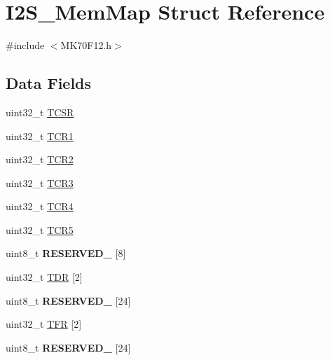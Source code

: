 \hypertarget{struct_i2_s___mem_map}{}\section{I2\+S\+\_\+\+Mem\+Map Struct Reference}
\label{struct_i2_s___mem_map}


{\ttfamily \#include $<$M\+K70\+F12.\+h$>$}

\subsection*{Data Fields}
\begin{DoxyCompactItemize}
\item 
uint32\+\_\+t \hyperlink{struct_i2_s___mem_map_a6a6cb435306769616551657a370e1aec}{T\+C\+S\+R}
\item 
uint32\+\_\+t \hyperlink{struct_i2_s___mem_map_a1e90b98887869de05cc981b80e2f50b4}{T\+C\+R1}
\item 
uint32\+\_\+t \hyperlink{struct_i2_s___mem_map_aa3e215825b6d333e5ee6ef35541b0474}{T\+C\+R2}
\item 
uint32\+\_\+t \hyperlink{struct_i2_s___mem_map_a98ceb21993839e209a3634870391b6a7}{T\+C\+R3}
\item 
uint32\+\_\+t \hyperlink{struct_i2_s___mem_map_a933a94f14922497e04bd3178585e6288}{T\+C\+R4}
\item 
uint32\+\_\+t \hyperlink{struct_i2_s___mem_map_ac559d60e95112859062a4a5427ebbc61}{T\+C\+R5}
\item 
\hypertarget{struct_i2_s___mem_map_aad317e69764cd5352bf752ca2d522c23}{}uint8\+\_\+t {\bfseries R\+E\+S\+E\+R\+V\+E\+D\+\_} \mbox{[}8\mbox{]}\label{struct_i2_s___mem_map_aad317e69764cd5352bf752ca2d522c23}

\item 
uint32\+\_\+t \hyperlink{struct_i2_s___mem_map_afc89841d02aecd4cadeb60365f27db8d}{T\+D\+R} \mbox{[}2\mbox{]}
\item 
\hypertarget{struct_i2_s___mem_map_ae3c5b8217e73c0f13e9c9db831bb929d}{}uint8\+\_\+t {\bfseries R\+E\+S\+E\+R\+V\+E\+D\+\_} \mbox{[}24\mbox{]}\label{struct_i2_s___mem_map_ae3c5b8217e73c0f13e9c9db831bb929d}

\item 
uint32\+\_\+t \hyperlink{struct_i2_s___mem_map_a85e13567695b53facaafbfdde35b8b0c}{T\+F\+R} \mbox{[}2\mbox{]}
\item 
\hypertarget{struct_i2_s___mem_map_ac47844b50c99fef04a1d67835ed2a450}{}uint8\+\_\+t {\bfseries R\+E\+S\+E\+R\+V\+E\+D\+\_} \mbox{[}24\mbox{]}\label{struct_i2_s___mem_map_ac47844b50c99fef04a1d67835ed2a450}


\end{DoxyCompactItemize}
